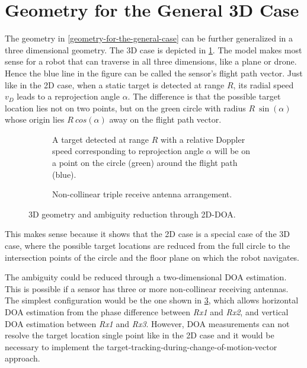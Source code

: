\section{Geometry for the General 3D Case}\label{geometry-for-the-3d-case}

The geometry in \cref{geometry-for-the-general-case} can be further generalized in a three dimensional geometry. The 3D case is depicted in \cref{fig:3dcase}. The model makes most sense for a robot that can traverse in all three dimensions, like a plane or drone. Hence the blue line in the figure can be called the sensor's flight path vector. Just like in the 2D case, when a static target is detected at range $R$, its radial speed $v_D$ leads to a reprojection angle $\alpha$. The difference is that the possible target location lies not on two points, but on the green circle with radius $R~\sin(\alpha)$ whose origin lies $R~cos(\alpha)$ away on the flight path vector.

\begin{figure}[htp]
    \begin{subfigure}[t]{.475\textwidth}
        \centering
        \def\svgwidth{5cm}
        
        \caption{A target detected at range \(R\) with a relative Doppler speed corresponding to reprojection angle \(\alpha\) will be on a point on the circle (green) around the flight path (blue).}
        \label{fig:3dcase}
    \end{subfigure}%
    \hfill%
    \begin{subfigure}[t]{.475\textwidth}
        \centering
        \def\svgwidth{5cm}
        
        \caption{Non-collinear triple receive antenna arrangement.}
        \label{fig:2ddoa}
    \end{subfigure}
    \caption{3D geometry and ambiguity reduction through 2D-DOA.}
\end{figure}

This makes sense because it shows that the 2D case is a special case of the 3D case, where the possible target locations are reduced from the full circle to the intersection points of the circle and the floor plane on which the robot navigates.

The ambiguity could be reduced through a two-dimensional DOA estimation. This is possible if a sensor has three or more non-collinear receiving antennas. The simplest configuration would be the one shown in \cref{fig:2ddoa}, which allows horizontal DOA estimation from the phase difference between \textit{Rx1} and \textit{Rx2}, and vertical DOA estimation between \textit{Rx1} and \textit{Rx3}. However, DOA measurements can not resolve the target location single point like in the 2D case and it would be necessary to implement the target-tracking-during-change-of-motion-vector approach.

